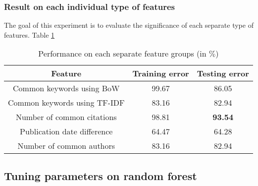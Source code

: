 \documentclass{article}
\begin{document}
\subsubsection{Result on each individual type of features}
The goal of this experiment is to evaluate the significance of each separate type of features. Table \ref{tab:separate}
\begin{table}
	\label{tab:separate}
	\centering
	\caption{Performance on each separate feature groups (in $\%$)}
	\begin{tabular}{|c|c|c|} \hline
		Feature&Training error&Testing error\\ \hline
		Common keywords using BoW&99.67&86.05\\ \hline
		Common keywords using TF-IDF&83.16&82.94\\ \hline
		Number of common citations&98.81&\textbf{93.54}\\ \hline
		Publication date difference&64.47&64.28\\ \hline
		Number of common authors&83.16&82.94\\ \hline
	\end{tabular}
\end{table}

\subsection{Tuning parameters on random forest}
\end{document}
